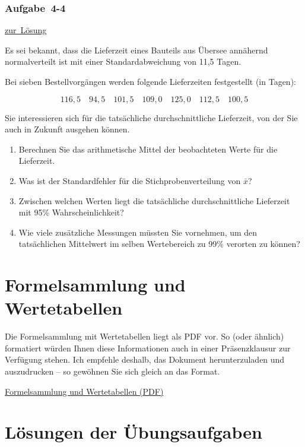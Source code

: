 \documentclass[
  11pt,
  ngerman,
  a4paper,
]{report}
\providecommand{\tightlist}{%
  \setlength{\itemsep}{0pt}\setlength{\parskip}{0pt}}
\begin{document}
\hypertarget{aufgabe-4-4}{%
\subsection{Aufgabe~4-4}\label{aufgabe-4-4}}

\protect\hyperlink{loesung-4-4}{zur~Lösung}

Es sei bekannt, dass die Lieferzeit eines Bauteils aus Übersee annähernd normalverteilt ist mit einer Standardabweichung von 11,5 Tagen.

Bei sieben Bestellvorgängen werden folgende Lieferzeiten festgestellt (in Tagen):

\[116,5\quad 94,5\quad101,5\quad109,0\quad125,0\quad112,5\quad100,5\]

Sie interessieren sich für die tatsächliche durchschnittliche Lieferzeit, von der Sie auch in Zukunft ausgehen können.

\begin{enumerate}
\def\labelenumi{\alph{enumi})}
\tightlist
\item
  Berechnen Sie das arithmetische Mittel der beobachteten Werte für die Lieferzeit.
\item
  Was ist der Standardfehler für die Stichprobenverteilung von \(\bar{x}\)?
\item
  Zwischen welchen Werten liegt die tatsächliche durchschnittliche Lieferzeit mit 95\% Wahrscheinlichkeit?
\item
  Wie viele zusätzliche Messungen müssten Sie vornehmen, um den tatsächlichen Mittelwert im selben Wertebereich zu 99\% verorten zu können?
\end{enumerate}

\hypertarget{formelsammlung-und-wertetabellen}{%
\chapter*{Formelsammlung und Wertetabellen}\label{formelsammlung-und-wertetabellen}}

Die Formelsammlung mit Wertetabellen liegt als PDF vor. So (oder ähnlich) formatiert würden Ihnen diese Informationen auch in einer Präsenzklausur zur Verfügung stehen. Ich empfehle deshalb, das Dokument herunterzuladen und auszudrucken -- so gewöhnen Sie sich gleich an das Format.

\href{Formelsammlung\%20und\%20Wertetabellen.pdf}{Formelsammlung und Wertetabellen (PDF)}

\hypertarget{luxf6sungen-der-uxfcbungsaufgaben}{%
\chapter*{Lösungen der Übungsaufgaben}\label{luxf6sungen-der-uxfcbungsaufgaben}}
\end{document}
